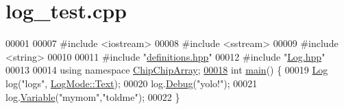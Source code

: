 \hypertarget{log__test_8cpp_source}{\section{log\+\_\+test.\+cpp}
\label{log__test_8cpp_source}
}

\begin{DoxyCode}
00001 
00007 \textcolor{preprocessor}{#include <iostream>}
00008 \textcolor{preprocessor}{#include <sstream>}
00009 \textcolor{preprocessor}{#include <string>}
00010 
00011 \textcolor{preprocessor}{#include "\hyperlink{definitions_8hpp}{definitions.hpp}"}
00012 \textcolor{preprocessor}{#include "\hyperlink{Log_8hpp}{Log.hpp}"}
00013 
00014 \textcolor{keyword}{using namespace }\hyperlink{namespaceChipChipArray}{ChipChipArray};
\hypertarget{log__test_8cpp_source_l00018}{}\hyperlink{log__test_8cpp_ae66f6b31b5ad750f1fe042a706a4e3d4}{00018} \textcolor{keywordtype}{int} \hyperlink{namespaceChipChipArray_a7fc3d1edffca11531cd09fdab7c8b88d}{main}() \{
00019     \hyperlink{classChipChipArray_1_1Log}{Log} log(\textcolor{stringliteral}{"logs"}, \hyperlink{definitions_8hpp_aa7380b6d694cab49f07aed6a7af592d9a9dffbf69ffba8bc38bc4e01abf4b1675}{LogMode::Text});
00020     log.\hyperlink{classChipChipArray_1_1Log_ac32b435af1577e4ebc67af2bdfea8eff}{Debug}(\textcolor{stringliteral}{"yolo!"});
00021     log.\hyperlink{classChipChipArray_1_1Log_a8849569720c26e335e7ef4dcb912170b}{Variable}(\textcolor{stringliteral}{"mymom"},\textcolor{stringliteral}{"toldme"});
00022 \}
\end{DoxyCode}
